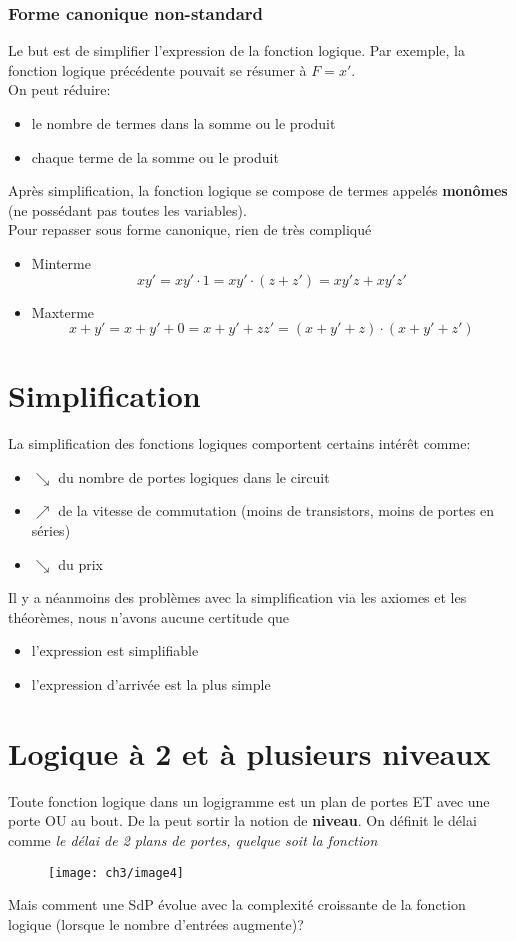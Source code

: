 \subsubsection{Forme canonique non-standard}
Le but est de simplifier l'expression de la fonction logique. Par exemple, la fonction logique précédente pouvait se résumer à $F=x'$.\\
On peut réduire:
\begin{itemize}
	\item le nombre de termes dans la somme ou le produit
	\item chaque terme de la somme ou le produit
\end{itemize}
Après simplification, la fonction logique se compose de termes appelés \textbf{monômes} (ne possédant pas toutes les variables).\\

Pour repasser sous forme canonique, rien de très compliqué
\begin{itemize}
	\item Minterme
	\begin{equation}
		xy'=xy'\cdot 1=xy'\cdot(z+z')=xy'z+xy'z'
	\end{equation}
	\item Maxterme
	\begin{equation}
		x+y'=x+y'+0=x+y'+zz'=(x+y'+z)\cdot(x+y'+z')
	\end{equation}
\end{itemize}
\section{Simplification}
La simplification des fonctions logiques comportent certains intérêt comme:
\begin{itemize}
	\item $\searrow$ du nombre de portes logiques dans le circuit
	\item $\nearrow$ de la vitesse de commutation (moins de transistors, moins de portes en séries)
	\item $\searrow$ du prix
\end{itemize}
Il y a néanmoins des problèmes avec la simplification via les axiomes et les théorèmes, nous n'avons aucune certitude que 
\begin{itemize}
	\item l'expression est simplifiable
	\item l'expression d'arrivée est la plus simple
\end{itemize} 
\section{Logique à 2 et à plusieurs niveaux}
Toute fonction logique dans un logigramme est un plan de portes ET avec une porte OU au bout. De la peut sortir la notion de \textbf{niveau}. On définit le délai comme \textit{le délai de 2 plans de portes, quelque soit la fonction}
\begin{figure}[H]
	\centering
	\texttt{[image: ch3/image4]}
\end{figure}
Mais comment une SdP évolue avec la complexité croissante de la fonction logique (lorsque le nombre d'entrées augmente)?\\

